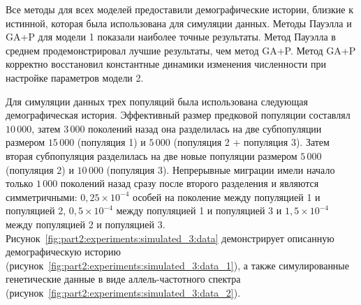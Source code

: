 Все методы для всех моделей предоставили демографические истории, близкие к истинной, которая была использована для симуляции данных.
Методы Пауэлла и GA+P для модели 1 показали наиболее точные результаты.
Метод Пауэлла в среднем продемонстрировал лучшие результаты, чем метод GA+P.
Метод GA+P корректно восстановил константные динамики изменения численности при настройке параметров модели 2.



Для симуляции данных трех популяций была использована следующая демографическая история.
Эффективный размер предковой популяции составлял $10{\,}000$, затем $3{\,}000$ поколений назад она разделилась на две субпопуляции размером $15{\,}000$ (популяция 1) и $5{\,}000$ (популяция 2 + популяция 3).
Затем вторая субпопуляция разделилась на две новые популяции размером $5{\,}000$ (популяция 2) и $10{\,}000$ (популяция 3).
Непрерывные миграции имели начало только $1{\,}000$ поколений назад сразу после второго разделения и являются симметричными: $0{,}25 \times 10^{-4}$ особей на поколение между популяцией 1 и популяцией 2, $0{,}5 \times 10^{-4}$ между популяцией 1 и популяцией 3 и $1{,}5 \times 10^{-4}$ между популяцией 2 и популяцией 3.
Рисунок~\ref{fig:part2:experiments:simulated_3:data} демонстрирует описанную демографическую историю (рисунок~\ref{fig:part2:experiments:simulated_3:data_1}), а также симулированные генетические данные в виде аллель-частотного спектра (рисунок~\ref{fig:part2:experiments:simulated_3:data_2}).

